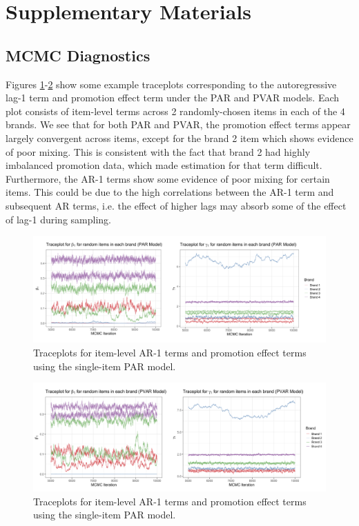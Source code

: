 \documentclass{article}
\begin{document}
\clearpage





\newpage
\section{Supplementary Materials}

\subsection{MCMC Diagnostics}

\noindent Figures \ref{fig:traceplot_par}-\ref{fig:traceplot_pvar} show some example traceplots corresponding to the autoregressive lag-1 term and promotion effect term under the PAR and PVAR models. Each plot consists of item-level terms across 2 randomly-chosen items in each of the 4 brands.  We see that for both PAR and PVAR, the promotion effect terms appear largely convergent across items, except for the brand 2 item which shows evidence of poor mixing. This is consistent with the fact that brand 2 had highly imbalanced promotion data, which made estimation for that term difficult. Furthermore, the AR-1 terms show some evidence of poor mixing for certain items. This could be due to the high correlations between the AR-1 term and subsequent AR terms, i.e. the effect of higher lags may absorb some of the effect of lag-1 during sampling.

\begin{figure}[!ht]
    \centering
    \includegraphics[width=1\linewidth]{figures/traceplot_par.png}
    \caption{Traceplots for item-level AR-1 terms and promotion effect terms using the single-item PAR model.}
    \label{fig:traceplot_par}
\end{figure}

\begin{figure}[!ht]
    \centering
    \includegraphics[width=1\linewidth]{figures/traceplot_pvar.png}
    \caption{Traceplots for item-level AR-1 terms and promotion effect terms using the single-item PAR model.}
    \label{fig:traceplot_pvar}
\end{figure}
\end{document}
